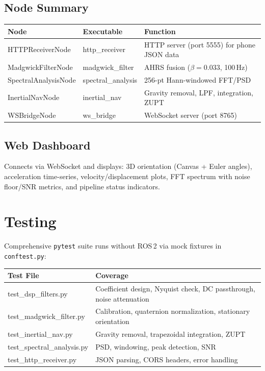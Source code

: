 \documentclass[12pt,a4paper]{article}
\begin{document}
\subsection{Node Summary}

\begin{center}
\begin{tabular}{|l|l|p{5.5cm}|}
\hline
\textbf{Node} & \textbf{Executable} & \textbf{Function} \\
\hline
HTTPReceiverNode     & http\_receiver     & HTTP server (port 5555) for phone JSON data \\
\hline
MadgwickFilterNode   & madgwick\_filter   & AHRS fusion ($\beta\!=\!0.033$, 100\,Hz) \\
\hline
SpectralAnalysisNode & spectral\_analysis & 256-pt Hann-windowed FFT/PSD \\
\hline
InertialNavNode      & inertial\_nav      & Gravity removal, LPF, integration, ZUPT \\
\hline
WSBridgeNode         & ws\_bridge         & WebSocket server (port 8765) \\
\hline
\end{tabular}
\end{center}

\subsection{Web Dashboard}
Connects via WebSocket and displays: 3D orientation (Canvas + Euler angles), acceleration time-series, velocity/displacement plots, FFT spectrum with noise floor/SNR metrics, and pipeline status indicators.

\section{Testing}

Comprehensive \texttt{pytest} suite runs without ROS\,2 via mock fixtures in \texttt{conftest.py}:

\begin{center}
\begin{tabular}{|l|p{7cm}|}
\hline
\textbf{Test File} & \textbf{Coverage} \\
\hline
test\_dsp\_filters.py      & Coefficient design, Nyquist check, DC passthrough, noise attenuation \\
\hline
test\_madgwick\_filter.py   & Calibration, quaternion normalization, stationary orientation \\
\hline
test\_inertial\_nav.py      & Gravity removal, trapezoidal integration, ZUPT \\
\hline
test\_spectral\_analysis.py & PSD, windowing, peak detection, SNR \\
\hline
test\_http\_receiver.py     & JSON parsing, CORS headers, error handling \\
\hline
\end{tabular}
\end{center}
\end{document}
